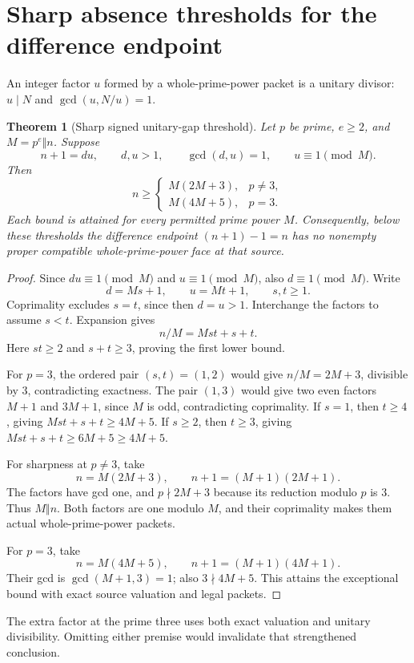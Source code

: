 \documentclass[11pt]{article}
\newtheorem{theorem}{Theorem}[section]
\theoremstyle{definition}\newtheorem{definition}[theorem]{Definition}
\theoremstyle{remark}\newtheorem{remark}[theorem]{Remark}
\begin{document}
\section{Sharp absence thresholds for the difference endpoint}
An integer factor \(u\) formed by a whole-prime-power packet is a unitary divisor: \(u\mid N\) and \(\gcd(u,N/u)=1\).
\begin{theorem}[Sharp signed unitary-gap threshold]\label{thm:threshold}
Let \(p\) be prime, \(e\ge2\), and \(M=p^e\Vert n\). Suppose
\[
 n+1=du,\qquad d,u>1,\qquad \gcd(d,u)=1,\qquad u\equiv1\pmod M.
\]
Then
\begin{equation}\label{eq:threshold}
 n\ge
 \begin{cases}
 M(2M+3),&p\ne3,\\
 M(4M+5),&p=3.
 \end{cases}
\end{equation}
Each bound is attained for every permitted prime power \(M\). Consequently, below these thresholds the difference endpoint \((n+1)-1=n\) has no nonempty proper compatible whole-prime-power face at that source.
\end{theorem}
\begin{proof}
Since \(du\equiv1\pmod M\) and \(u\equiv1\pmod M\), also \(d\equiv1\pmod M\). Write
\[
 d=Ms+1,\qquad u=Mt+1,\qquad s,t\ge1.
\]
Coprimality excludes \(s=t\), since then \(d=u>1\). Interchange the factors to assume \(s<t\). Expansion gives
\begin{equation}\label{eq:bilinear}
 n/M=Mst+s+t.
\end{equation}
Here \(st\ge2\) and \(s+t\ge3\), proving the first lower bound.

For \(p=3\), the ordered pair \((s,t)=(1,2)\) would give \(n/M=2M+3\), divisible by \(3\), contradicting exactness. The pair \((1,3)\) would give two even factors \(M+1\) and \(3M+1\), since \(M\) is odd, contradicting coprimality. If \(s=1\), then \(t\ge4\), giving \(Mst+s+t\ge4M+5\). If \(s\ge2\), then \(t\ge3\), giving \(Mst+s+t\ge6M+5\ge4M+5\).

For sharpness at \(p\ne3\), take
\[
 n=M(2M+3),\qquad n+1=(M+1)(2M+1).
\]
The factors have gcd one, and \(p\nmid2M+3\) because its reduction modulo \(p\) is \(3\). Thus \(M\Vert n\). Both factors are one modulo \(M\), and their coprimality makes them actual whole-prime-power packets.

For \(p=3\), take
\[
 n=M(4M+5),\qquad n+1=(M+1)(4M+1).
\]
Their gcd is \(\gcd(M+1,3)=1\); also \(3\nmid4M+5\). This attains the exceptional bound with exact source valuation and legal packets.
\end{proof}
The extra factor at the prime three uses both exact valuation and unitary divisibility. Omitting either premise would invalidate that strengthened conclusion.
\end{document}
